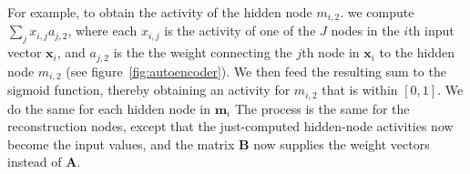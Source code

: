For example, to obtain the activity of the hidden node $m_{i,2}$.
we compute $\sum_{j} x_{i,j} a_{j,2}$, where each $x_{i,j}$ is the activity of one of the $J$ nodes in the $i$th input vector $\textbf{x}_i$, and $a_{j,2}$ is the the weight connecting the $j$th node in $\textbf{x}_i$ to the hidden node $m_{i,2}$ (see figure~\ref{fig:autoencoder}).
We then feed the resulting sum to the sigmoid function, thereby obtaining an activity for $m_{i,2}$ that is within $[0,1]$. 
We do the same for each hidden node in $\textbf{m}_i$
The process is the same for the reconstruction nodes, except that the just-computed hidden-node activities now become the input values, and the matrix $\textbf{B}$ now supplies the weight vectors instead of $\textbf{A}$.

